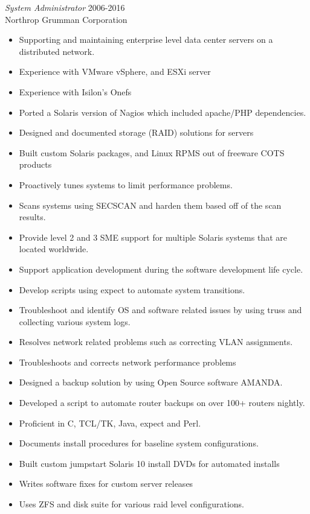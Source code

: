 \documentclass[margin, 10pt]{res} %
\begin{document}
\begin{resume}
{\sl System Administrator } \hfill 2006-2016 \\
Northrop Grumman Corporation
\begin{itemize}
  \item Supporting and maintaining enterprise level data center servers on a distributed network.
  \item Experience with VMware vSphere, and ESXi server
  \item Experience with Isilon’s Onefs
  \item Ported a Solaris version of Nagios which included apache/PHP dependencies.
  \item Designed and documented storage (RAID) solutions for servers
  \item Built custom Solaris packages, and Linux RPMS out of freeware COTS products
  \item Proactively tunes systems to limit performance problems.
  \item Scans systems using SECSCAN and harden them based off of the scan results.
  \item Provide level 2 and 3 SME support for multiple Solaris systems that are located worldwide.
  \item Support application development during the software development life cycle.
  \item Develop scripts using expect to automate system transitions.
  \item Troubleshoot and identify OS and software related issues by using truss and collecting various system logs.
  \item Resolves network related problems such as correcting VLAN assignments.
  \item Troubleshoots and corrects network performance problems
  \item Designed a backup solution by using Open Source software AMANDA.
  \item Developed a script to automate router backups on over 100+ routers nightly.
  \item Proficient in C, TCL/TK, Java, expect and Perl.
  \item Documents install procedures for baseline system configurations.
  \item Built custom jumpstart Solaris 10 install DVDs for automated installs
  \item Writes software fixes for custom server releases
  \item Uses ZFS and disk suite for various raid level configurations.
\end{itemize}


\end{resume}
\end{document}
